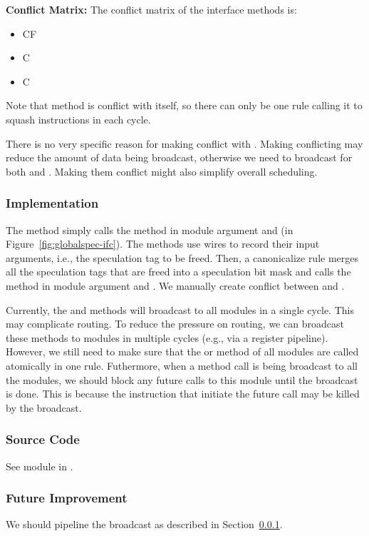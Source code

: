 \noindent\textbf{Conflict Matrix:}
The conflict matrix of the interface methods is:
\begin{itemize}
    \item {} CF 
    \item {} C 
    \item {} C 
\end{itemize}
Note that method  is conflict with itself, so there can only be one rule calling it to squash instructions in each cycle.

There is no very specific reason for making  conflict with .
Making conflicting may reduce the amount of data being broadcast, otherwise we need to broadcast  for both  and .
Making them conflict might also simplify overall scheduling.

\subsubsection{Implementation}\label{sec:globalspec:impl}
The  method simply calls the  method in module argument  and  (in Figure~\ref{fig:globalspec-ifc}).
The  methods use wires to record their input arguments, i.e., the speculation tag to be freed.
Then, a canonicalize rule  merges all the speculation tags that are freed into a speculation bit mask and calls the  method in module argument  and .
We manually create conflict between  and .

Currently, the  and  methods will broadcast to all modules in a single cycle.
This may complicate routing.
To reduce the pressure on routing, we can broadcast these methods to modules in multiple cycles (e.g., via a register pipeline).
However, we still need to make sure that the  or  method of all modules are called atomically in one rule.
Futhermore, when a  method call is being broadcast to all the modules, we should block any future calls to this module until the broadcast is done.
This is because the instruction that initiate the future call may be killed by the broadcast.

\subsubsection{Source Code}
See module  in .

\subsubsection{Future Improvement}
We should pipeline the broadcast as described in Section~\ref{sec:globalspec:impl}.
